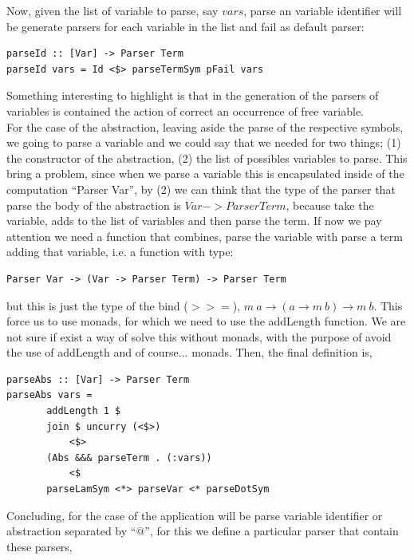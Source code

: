 \documentclass[a4paper,10pt]{article}
\begin{document}
Now, given the list of variable to parse, say $vars$, parse an variable identifier
will be generate parsers for each variable in the list and fail as default parser:

\begin{lstlisting}
parseId :: [Var] -> Parser Term
parseId vars = Id <$> parseTermSym pFail vars
\end{lstlisting}

Something interesting to highlight is that in the generation of the parsers of
variables is contained the action of correct an occurrence of free variable.\\

For the case of the abstraction, leaving aside the parse of the respective symbols,
we going to parse a variable and we could say that we needed for two things;
(1) the constructor of the abstraction, (2) the list of possibles variables to parse.
This bring a problem, since when we parse a variable this is encapsulated inside
of the computation ``Parser Var'', by (2) we can think that the type of the parser
that parse the body of the abstraction is $Var -> Parser Term$, because take the
variable, adds to the list of variables and then parse the term.
If now we pay attention we need a function that combines, parse the variable with
parse a term adding that variable, i.e. a function with type:

\begin{lstlisting}
Parser Var -> (Var -> Parser Term) -> Parser Term
\end{lstlisting}

but this is just the type of the bind ($>>=$), $m \ a \rightarrow (a \rightarrow m \ b) \rightarrow m \ b$. This force us to use monads, for which we need to use the addLength function. We are
not sure if exist a way of solve this without monads, with the purpose of avoid the
use of addLength and of course... monads. Then, the final definition is,

\begin{lstlisting}
parseAbs :: [Var] -> Parser Term
parseAbs vars = 
       addLength 1 $
       join $ uncurry (<$>) 
           <$> 
       (Abs &&& parseTerm . (:vars))
       	   <$ 
       parseLamSym <*> parseVar <* parseDotSym
\end{lstlisting}

Concluding, for the case of the application will be parse variable identifier or
abstraction separated by ``$@$'', for this we define a particular parser that
contain these parsers,
\end{document}

